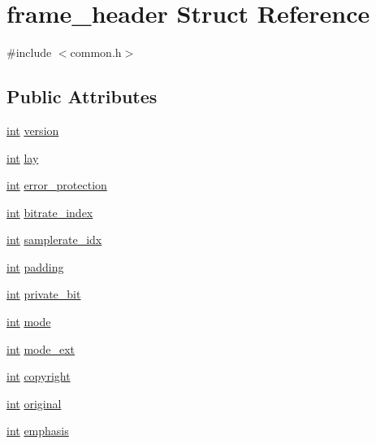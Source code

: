 \hypertarget{structframe__header}{}\section{frame\+\_\+header Struct Reference}
\label{structframe__header}


{\ttfamily \#include $<$common.\+h$>$}

\subsection*{Public Attributes}
\begin{DoxyCompactItemize}
\item 
\hyperlink{xmltok_8h_a5a0d4a5641ce434f1d23533f2b2e6653}{int} \hyperlink{structframe__header_a7c92a7131bf19d4340ffeecc3f893d09}{version}
\item 
\hyperlink{xmltok_8h_a5a0d4a5641ce434f1d23533f2b2e6653}{int} \hyperlink{structframe__header_a719d105e9a5983f057946a8dc351f90b}{lay}
\item 
\hyperlink{xmltok_8h_a5a0d4a5641ce434f1d23533f2b2e6653}{int} \hyperlink{structframe__header_ac8672e3ecb3c44f8763931e225652d0b}{error\+\_\+protection}
\item 
\hyperlink{xmltok_8h_a5a0d4a5641ce434f1d23533f2b2e6653}{int} \hyperlink{structframe__header_ad219005f5e70c73d083bfcc7f88dadaa}{bitrate\+\_\+index}
\item 
\hyperlink{xmltok_8h_a5a0d4a5641ce434f1d23533f2b2e6653}{int} \hyperlink{structframe__header_aeaaf556b174d5d6c8d719f34d4f9154e}{samplerate\+\_\+idx}
\item 
\hyperlink{xmltok_8h_a5a0d4a5641ce434f1d23533f2b2e6653}{int} \hyperlink{structframe__header_a7619c413891eee701508eade187f659d}{padding}
\item 
\hyperlink{xmltok_8h_a5a0d4a5641ce434f1d23533f2b2e6653}{int} \hyperlink{structframe__header_a1f602c0aa4f7a28ba1bc48e321037baa}{private\+\_\+bit}
\item 
\hyperlink{xmltok_8h_a5a0d4a5641ce434f1d23533f2b2e6653}{int} \hyperlink{structframe__header_a8317914fab0cb6b5357731baf40f38d9}{mode}
\item 
\hyperlink{xmltok_8h_a5a0d4a5641ce434f1d23533f2b2e6653}{int} \hyperlink{structframe__header_a776cfc6aeca369b948f54fa9e3d99b59}{mode\+\_\+ext}
\item 
\hyperlink{xmltok_8h_a5a0d4a5641ce434f1d23533f2b2e6653}{int} \hyperlink{structframe__header_a096ededb94b3b7984c75b15c8f9cfe9f}{copyright}
\item 
\hyperlink{xmltok_8h_a5a0d4a5641ce434f1d23533f2b2e6653}{int} \hyperlink{structframe__header_abfbb3dfe82609ea7ac3231a6f8ae7ea6}{original}
\item 
\hyperlink{xmltok_8h_a5a0d4a5641ce434f1d23533f2b2e6653}{int} \hyperlink{structframe__header_ab703f3bb552285c732464b3c0d7a1c52}{emphasis}
\end{DoxyCompactItemize}


